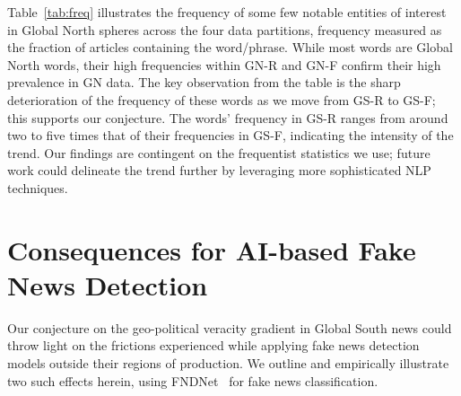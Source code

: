 \documentclass[runningheads]{llncs}
\begin{document}
Table~\ref{tab:freq} illustrates the frequency of some few notable entities of interest in Global North spheres across the four data partitions, frequency measured as the fraction of articles containing the word/phrase. While most words are Global North words, their high frequencies within GN-R and GN-F confirm their high prevalence in GN data. The key observation from the table is the sharp deterioration of the frequency of these words as we move from GS-R to GS-F; this supports our conjecture. The words' frequency in GS-R ranges from around two to five times that of their frequencies in GS-F, indicating the intensity of the trend. Our findings are contingent on the frequentist statistics we use; future work could delineate the trend further by leveraging more sophisticated NLP techniques. 

\section{Consequences for AI-based Fake News Detection}

Our conjecture on the geo-political veracity gradient in Global South news could throw light on the frictions experienced while applying fake news detection models outside their regions of production. We outline and empirically illustrate two such effects herein, using FNDNet~\cite{kaliyar2020fndnet} for fake news classification. 
\end{document}
